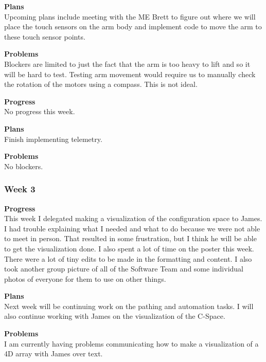 \textbf{Plans} \\
Upcoming plans include meeting with the ME Brett to figure out where we will place the touch sensors on the arm body and implement code to move the arm 
to these touch sensor points.

\textbf{Problems} \\
Blockers are limited to just the fact that the arm is too heavy to lift and so it will be hard to test. Testing arm movement would require us to manually 
check the rotation of the motors using a compass. This is not ideal.

\textbf{Progress} \\
No progress this week.

\textbf{Plans} \\
Finish implementing telemetry.

\textbf{Problems} \\
No blockers.

\subsubsection{Week 3}
\textbf{Progress} \\ 
This week I delegated making a visualization of the configuration space to James. I had trouble explaining what I needed and what to do because we were not able to meet in person. That resulted in some frustration, but I think he will be able to get the visualization done. I also spent a lot of time on the poster this week. There were a lot of tiny edits to be made in the formatting and content. I also took another group picture of all of the Software Team and some individual photos of everyone for them to use on other things.

\textbf{Plans} \\ 
Next week will be continuing work on the pathing and automation tasks. I will also continue working with James on the visualization of the C-Space.

\textbf{Problems} \\
I am currently having problems communicating how to make a visualization of a 4D array with James over text.

